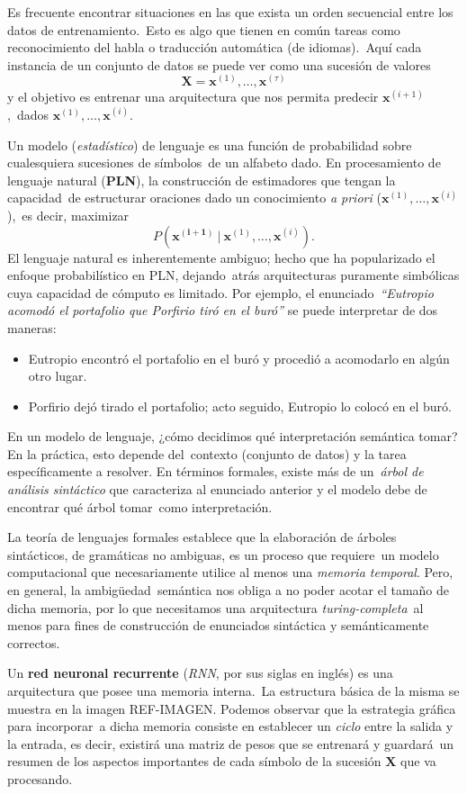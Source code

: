 \noindent
Es frecuente encontrar situaciones en las que exista un orden secuencial entre los datos de entrenamiento.\
Esto es algo que tienen en común tareas como reconocimiento del habla o traducción automática (de idiomas).\
Aquí cada instancia de un conjunto de datos se puede ver como una sucesión de valores
\[\mathbf{X} = \mathbf{x}^{(1)},\ldots,\mathbf{x}^{(\tau)}\]
y el objetivo es entrenar una arquitectura que nos permita predecir $\mathbf{x}^{(i+1)}$,\
dados $\mathbf{x}^{(1)},\ldots,\mathbf{x}^{(i)}$.\par
Un modelo (\emph{estadístico}) de lenguaje es una función de probabilidad sobre cualesquiera sucesiones de símbolos\
de un alfabeto dado. En procesamiento de lenguaje natural (\textbf{PLN}), la construcción de estimadores que tengan la capacidad\
de estructurar oraciones dado un conocimiento \emph{a priori} ($\mathbf{x}^{(1)},\ldots,\mathbf{x}^{(i)}$),\
es decir, maximizar
\begin{equation}
  P(\mathbf{x^{(i+1)}}\ |\ \mathbf{x}^{(1)},\ldots,\mathbf{x}^{(i)}).
\end{equation}
El lenguaje natural es inherentemente ambiguo; hecho que ha popularizado el enfoque probabilístico en PLN, dejando\
atrás arquitecturas puramente simbólicas cuya capacidad de cómputo es limitado. Por ejemplo, el enunciado\
\emph{``Eutropio acomodó el portafolio que Porfirio tiró en el buró''} se puede interpretar de dos maneras:
\begin{itemize}
\item Eutropio encontró el portafolio en el buró y procedió a acomodarlo en algún otro lugar.
\item Porfirio dejó tirado el portafolio; acto seguido, Eutropio lo colocó en el buró.
\end{itemize}\par
En un modelo de lenguaje, ¿cómo decidimos qué interpretación semántica tomar? En la práctica, esto depende del\
contexto (conjunto de datos) y la tarea específicamente a resolver. En términos formales, existe más de un\
\emph{árbol de análisis sintáctico} que caracteriza al enunciado anterior y el modelo debe de encontrar qué árbol tomar\
como interpretación.\par
La teoría de lenguajes formales establece que la elaboración de árboles sintácticos, de gramáticas no ambiguas, es un proceso que requiere\
un modelo computacional que necesariamente utilice al menos una \emph{memoria temporal}. Pero, en general, la ambigüedad\
semántica nos obliga a no poder acotar el tamaño de dicha memoria, por lo que necesitamos una arquitectura \emph{turing-completa}\
al menos para fines de construcción de enunciados sintáctica y semánticamente correctos.\par
Un \textbf{red neuronal recurrente} (\emph{RNN}, por sus siglas en inglés) es una arquitectura que posee una memoria interna.\
La estructura básica de la misma se muestra en la imagen REF-IMAGEN. Podemos observar que la estrategia gráfica para incorporar\
a dicha memoria consiste en establecer un \emph{ciclo} entre la salida y la entrada, es decir, existirá una matriz de pesos que se entrenará y guardará\
un resumen de los aspectos importantes de cada símbolo de la sucesión $\mathbf{X}$ que va procesando.

